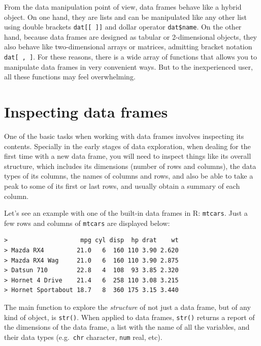 \documentclass[
]{book}
\begin{document}
From the data manipulation point of view, data frames behave like a hybrid
object. On one hand, they are lists and can be manipulated like any other list
using double brackets \texttt{dat{[}{[}\ {]}{]}} and dollar operator \texttt{dat\$name}.
On the other hand, because data frames are designed as tabular or 2-dimensional
objects, they also behave like two-dimensional arrays or matrices, admitting
bracket notation \texttt{dat{[}\ ,\ {]}}. For these reasons, there is a wide array of
functions that allows you to manipulate data frames in very convenient ways.
But to the inexperienced user, all these functions may feel overwhelming.

\hypertarget{inspecting-data-frames}{%
\section{Inspecting data frames}\label{inspecting-data-frames}}

One of the basic tasks when working with data frames involves inspecting its
contents. Specially in the early stages of data exploration, when dealing for
the first time with a new data frame, you will need to inspect things like
its overall structure, which includes its dimensions (number of rows and
columns), the data types of its columns, the names of columns and rows, and
also be able to take a peak to some of its first or last rows, and usually
obtain a summary of each column.

Let's see an example with one of the built-in data frames in R: \texttt{mtcars}.
Just a few rows and columns of \texttt{mtcars} are displayed below:

\begin{verbatim}
>                    mpg cyl disp  hp drat    wt
> Mazda RX4         21.0   6  160 110 3.90 2.620
> Mazda RX4 Wag     21.0   6  160 110 3.90 2.875
> Datsun 710        22.8   4  108  93 3.85 2.320
> Hornet 4 Drive    21.4   6  258 110 3.08 3.215
> Hornet Sportabout 18.7   8  360 175 3.15 3.440
\end{verbatim}

The main function to explore the \emph{structure} of not just a data frame, but of
any kind of object, is \texttt{str()}. When applied to data frames, \texttt{str()} returns a
report of the dimensions of the data frame, a list with the name of all the
variables, and their data types (e.g.~\texttt{chr} character, \texttt{num} real, etc).
\end{document}
